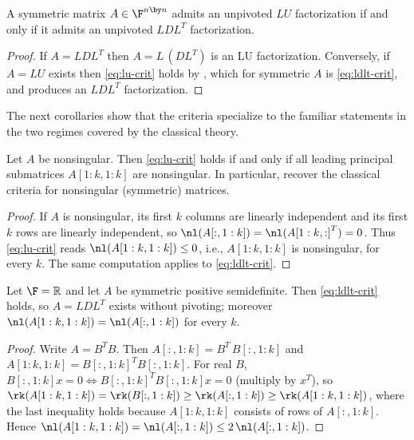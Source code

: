 \begin{corollary}\label{cor:sym-lu-ldlt}
  A symmetric matrix $A \in \F^{n \by n}$ admits an unpivoted $LU$
  factorization if and only if it admits an unpivoted $LDL^T$ factorization.
\end{corollary}

\begin{proof}
  If $A = LDL^T$ then $A = L \, (DL^T)$ is an LU factorization.  Conversely,
  if $A = LU$ exists then \cref{eq:lu-crit} holds by , which
  for symmetric $A$ is \cref{eq:ldlt-crit}, and  produces an
  $LDL^T$ factorization.
\end{proof}

The next corollaries show that the criteria specialize to the familiar
statements in the two regimes covered by the classical theory.

\begin{corollary}\label{cor:nonsingular}
  Let $A$ be nonsingular.  Then \cref{eq:lu-crit} holds if and only if all
  leading principal submatrices $A[1:k,1:k]$ are nonsingular.  In
  particular,  recover the classical criteria for
  nonsingular (symmetric) matrices.
\end{corollary}

\begin{proof}
  If $A$ is nonsingular, its first $k$ columns are linearly independent and
  its first $k$ rows are linearly independent, so
  $\nl(A[:,1:k]) = \nl({A[1:k,:]}^T) = 0$.  Thus \cref{eq:lu-crit} reads
  $\nl(A[1:k,1:k]) \le 0$, i.e., $A[1:k,1:k]$ is nonsingular, for every
  $k$.  The same computation applies to \cref{eq:ldlt-crit}.
\end{proof}

\begin{corollary}\label{cor:psd}
  Let $\F = \mathbb{R}$ and let $A$ be symmetric positive semidefinite.
  Then \cref{eq:ldlt-crit} holds, so $A = LDL^T$ exists without pivoting;
  moreover $\nl(A[1:k,1:k]) = \nl(A[:,1:k])$ for every $k$.
\end{corollary}

\begin{proof}
  Write $A = B^T B$.  Then $A[:,1:k] = B^T \, B[:,1:k]$ and
  $A[1:k,1:k] = {B[:,1:k]}^T B[:,1:k]$.  For real $B$,
  $B[:,1:k] x = 0 \iff {B[:,1:k]}^T B[:,1:k] x = 0$ (multiply by $x^T$), so
  $\rk(A[1:k,1:k]) = \rk(B[:,1:k]) \ge \rk(A[:,1:k]) \ge
  \rk(A[1:k,1:k])$, where the last inequality holds because $A[1:k,1:k]$
  consists of rows of $A[:,1:k]$.  Hence
  $\nl(A[1:k,1:k]) = \nl(A[:,1:k]) \le 2\,\nl(A[:,1:k])$.
\end{proof}

